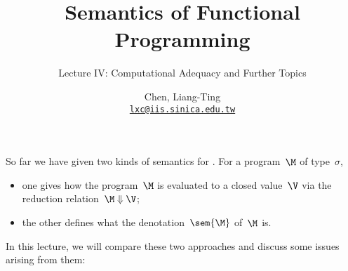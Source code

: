 \title{Semantics of Functional Programming}
\subtitle{Lecture IV: Computational Adequacy and Further Topics}
\author[L.-T. Chen]{Chen, Liang-Ting\\
  \href{mailto:lxc@iis.sinica.edu.tw}{\texttt{lxc@iis.sinica.edu.tw}}}

\frame{\maketitle}

\begin{frame}
  So far we have given two kinds of semantics for \PCF{}. For a program~$\M$ of
  type~$\sigma$,
  \begin{itemize}
    \item one gives how the program~$\M$ is evaluated to a closed value~$\V$
      via the reduction relation~$\M \Downarrow\V$;
    \item the other defines what the denotation~$\sem{\M}$ of~$\M$ is.
    \end{itemize}
  In this lecture, we will compare these two approaches and discuss some issues
  arising from them:
  \begin{description}
    \item[Correctness]
    \item[Completeness]
    \item[Computational adequacy]
    \item[Full abstraction]
  \end{description}

\end{frame}
